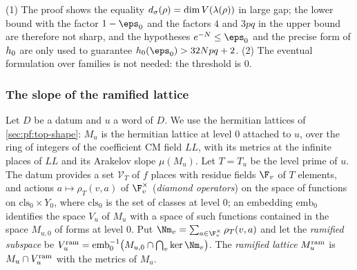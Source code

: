 \begin{remark}\label{pf:sh-curv:dsig-rem}
(1) The proof shows the equality $d_\sigma(\rho)=\dim V(\lambda(\rho))$ in large gap; the lower bound with the factor
$1-\eps_0$ and the factors $4$ and $3pq$ in the upper bound are therefore not sharp, and the hypotheses $e^{-N}\le\eps_0$
and the precise form of $h_0$ are only used to guarantee $\shcurvGap(\eps_0)>32Npq+2$. (2) The eventual
formulation over families is not needed: the threshold is $0$.
\end{remark}

\subsubsection{The slope of the ramified lattice}

\begin{definition}\label{pf:sh-curv:ramdef}
Let $D$ be a datum and $u$ a word of $D$. We use the hermitian lattices of \cref{sec:pf:top-shape}: $M_u$ is the hermitian
lattice at level $0$ attached to $u$, over the ring of integers of the coefficient CM field $\mathit{LL}$, with its
metrics at the infinite places of $\mathit{LL}$ and its Arakelov slope $\mu(M_u)$. Let $T=T_u$ be the level prime of $u$.
The datum provides a set $\mathcal V_T$ of $f$ places with residue fields $\F_v$ of $T$ elements, and actions
$a\mapsto\rho_T(v,a)$ of $\F_v^\times$ (\emph{diamond operators}) on the space of functions on $\mathrm{cls}_0\times Y_0$,
where $\mathrm{cls}_0$ is the set of classes at level $0$; an embedding $\mathrm{emb}_0$ identifies the space $V_u$ of
$M_u$ with a space of such functions contained in the space $M_{u,0}$ of forms at level $0$. Put
$\Nm_v=\sum_{a\in\F_v^\times}\rho_T(v,a)$ and let the \emph{ramified subspace} be
$V_u^{\shcurvRam}=\mathrm{emb}_0^{-1}\bigl(M_{u,0}\cap\bigcap_v\ker\Nm_v\bigr)$. The \emph{ramified lattice}
$M_u^{\mathrm{ram}}$ is $M_u\cap V_u^{\mathrm{ram}}$ with the metrics of $M_u$.
\end{definition}

